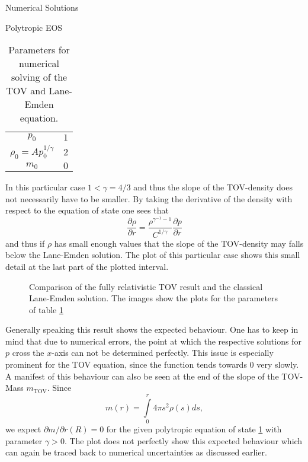 \begin{section}{Numerical Solutions}
\begin{subsection}{Polytropic EOS}
\begin{table}[h]
\begin{tabular}{|c|c|}
		$p_0$ & $1$ \\
		$\rho_0=Ap_0^{1/\gamma}$ & $2$\\ 
		$m_0$ & $0$\\
		\hline
	\end{tabular}
	\caption[Numerical Parameters for TOV and Lane-Emden equation]{Parameters for numerical solving of the TOV and Lane-Emden equation.}
	\label{4-NumSol-TOVParameters}
\end{table}
In this particular case $1<\gamma=4/3$ and thus the slope of the TOV-density does not necessarily have to be smaller. By taking the derivative of the density with respect to the equation of state one sees that
\begin{equation}
	\frac{\partial\rho}{\partial r} = \frac{\rho^{\gamma^{-1}-1}}{C^{1/\gamma}}\frac{\partial p}{\partial r}
\end{equation}
and thus if $\rho$ has small enough values that the slope of the TOV-density may falls below the Lane-Emden solution. The plot of this particular case shows this small detail at the last part of the plotted interval.
\begin{figure}[H]
	\centering
	
	\caption[Comparison TOV and Lane-Emden equation]{Comparison of the fully relativistic TOV result and the classical Lane-Emden solution. The images show the plots for the parameters of table \ref{4-NumSol-TOVParameters}}
	\label{4-NumSol-TOVEqEasyEOS}
\end{figure}\noindent
Generally speaking this result shows the expected behaviour. One has to keep in mind that due to numerical errors, the point at which the respective solutions for $p$ cross the $x$-axis can not be determined perfectly. This issue is especially prominent for the TOV equation, since the function tends towards $0$ very slowly.\\
A manifest of this behaviour can also be seen at the end of the slope of the TOV-Mass $m_{\text{TOV}}$. Since
\begin{equation}
	m(r) = \int\limits_0^r 4\pi s^2\rho(s)ds,
\end{equation}
we expect $\partial m/\partial r(R)=0$ for the given polytropic equation of state \ref{4-NumSol-TOVParameters} with parameter $\gamma>0$. The plot does not perfectly show this expected behaviour which can again be traced back to numerical uncertainties as discussed earlier.

\end{subsection}
\end{section}
